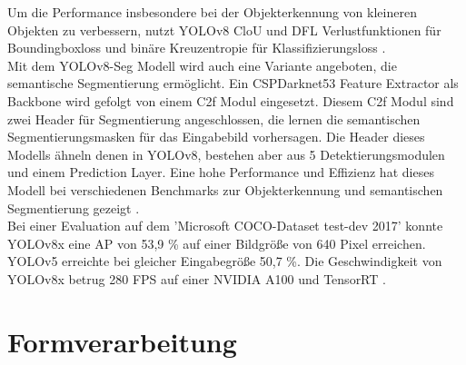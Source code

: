 {{	Um die Performance insbesondere bei der Objekterkennung von kleineren Objekten zu verbessern, nutzt YOLOv8 CloU \citep{Zheng2020} und DFL \citep{Li2020} Verlustfunktionen für Boundingboxloss und binäre Kreuzentropie für Klassifizierungsloss \citep{Terven2023}. \\

	Mit dem YOLOv8-Seg Modell wird auch eine Variante angeboten, die semantische Segmentierung ermöglicht. Ein CSPDarknet53 Feature Extractor als Backbone wird gefolgt von einem C2f Modul eingesetzt. Diesem C2f Modul sind zwei Header für Segmentierung angeschlossen, die lernen die semantischen Segmentierungsmasken für das Eingabebild vorhersagen. Die Header dieses Modells ähneln denen in  YOLOv8, bestehen aber aus 5 Detektierungsmodulen und einem Prediction Layer. Eine hohe Performance und Effizienz hat dieses Modell bei verschiedenen Benchmarks zur Objekterkennung und semantischen Segmentierung gezeigt \citep{Terven2023}. \\
	Bei einer Evaluation auf dem 'Microsoft COCO-Dataset test-dev 2017' konnte YOLOv8x eine AP von 53,9 \% auf einer Bildgröße von 640 Pixel erreichen. YOLOv5 erreichte bei gleicher Eingabegröße 50,7 \%. Die Geschwindigkeit von YOLOv8x betrug 280 FPS auf einer NVIDIA A100 und TensorRT \citep{Terven2023}.
	}
}

\clearpage

\chapter{Formverarbeitung}

